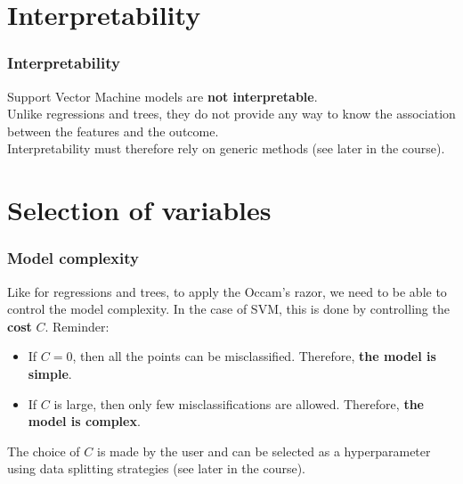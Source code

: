 \section{Interpretability}
\begin{frame}
\frametitle{Interpretability}
Support Vector Machine models are {\bf not interpretable}. \\
\vspace{0.3cm}
Unlike regressions and trees, they do not provide any way to know the association between the features and the outcome.\\
\vspace{0.3cm}
Interpretability must therefore rely on generic methods (see later in the course).
\end{frame}
\section{Selection of variables}
\begin{frame}
\frametitle{Model complexity}
Like for regressions and trees, to apply the Occam's razor, we need to be able to control the model complexity. In the case of SVM, this is done by controlling the {\bf cost} $C$. Reminder:
\begin{itemize}
\item If $C=0$, then all the points can be misclassified. Therefore, {\bf the model is simple}.
\item If $C$ is large, then only few misclassifications are allowed. Therefore, {\bf the model is complex}.
\end{itemize}
The choice of $C$ is made by the user and can be selected as a hyperparameter using data splitting strategies (see later in the course).
\end{frame}
